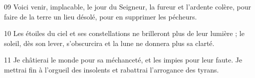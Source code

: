 
09 Voici venir, implacable, le jour du Seigneur, la fureur et l’ardente colère, pour faire de la terre un lieu désolé, pour en supprimer les pécheurs.

10 Les étoiles du ciel et ses constellations ne brilleront plus de leur lumière ; le soleil, dès son lever, s’obscurcira et la lune ne donnera plus sa clarté.

11 Je châtierai le monde pour sa méchanceté, et les impies pour leur faute. Je mettrai fin à l’orgueil des insolents et rabattrai l’arrogance des tyrans.